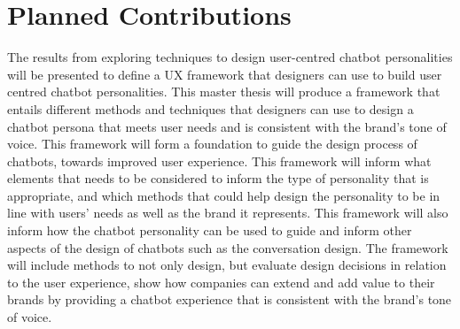 \section{Planned Contributions}
The results from exploring techniques to design user-centred chatbot personalities will be presented to define a UX framework that designers can use to build user centred chatbot personalities. This master thesis will produce a framework that entails different methods and techniques that designers can use to design a chatbot persona that meets user needs and is consistent with the brand's tone of voice. This framework will form a foundation to guide the design process of chatbots, towards improved user experience. This framework will inform what elements that needs to be considered to inform the type of personality that is appropriate, and which methods that could help design the personality to be in line with users' needs as well as the brand it represents. This framework will also inform how the chatbot personality can be used to guide and inform other aspects of the design of chatbots such as the conversation design. The framework will include methods to not only design, but evaluate design decisions in relation to the user experience, show how companies can extend and add value to their brands by providing a chatbot experience that is consistent with the brand's tone of voice.